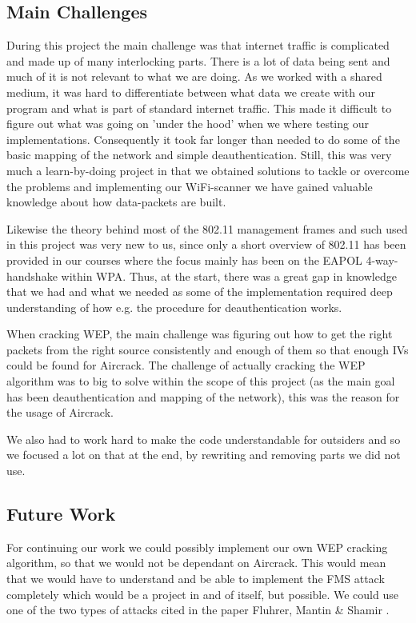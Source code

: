 \subsection{Main Challenges}

During this project the main challenge was that internet traffic is complicated and made up of many interlocking parts. There is a lot of data being sent and much of it is not relevant to what we are doing. As we worked with a shared medium, it was hard to differentiate between what data we create with our program and what is part of standard internet traffic. This made it difficult to figure out what was going on 'under the hood' when we where testing our implementations. Consequently it took far longer than needed to do some of the basic mapping of the network and simple deauthentication. Still, this was very much a learn-by-doing project in that we obtained solutions to tackle or overcome the problems and implementing our WiFi-scanner we have gained valuable knowledge about how data-packets are built. 

Likewise the theory behind most of the 802.11 management frames and such used in this project was very new to us, since only a short overview of 802.11 has been provided in our courses where the focus mainly has been on the EAPOL 4-way-handshake within WPA. Thus, at the start, there was a great gap in knowledge that we had and what we needed as some of the implementation required deep understanding of how e.g. the procedure for deauthentication works.

When cracking WEP, the main challenge was figuring out how to get the right packets from the right source consistently and enough of them so that enough IVs could be found for Aircrack. The challenge of actually cracking the WEP algorithm was to big to solve within the scope of this project (as the main goal has been deauthentication and mapping of the network), this was the reason for the usage of Aircrack.

We also had to work hard to make the code understandable for outsiders and so we focused a lot on that at the end, by rewriting and removing parts we did not use. 


\subsection{Future Work}
For continuing our work we could possibly implement our own WEP cracking algorithm, so that we would not be dependant on Aircrack. This would mean that we would have to understand and be able to implement the FMS attack completely which would be a project in and of itself, but possible. We could use one of the two types of attacks cited in the paper Fluhrer, Mantin \& Shamir \cite{Weakness}.

